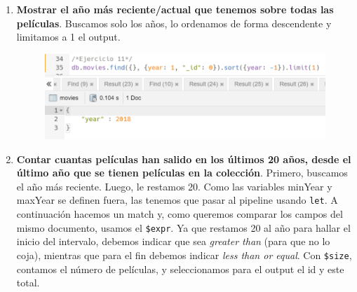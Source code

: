 \documentclass[a4paper,onecolumn]{article}
\begin{document}
\begin{sloppypar}
\begin{enumerate}
\begin{center}
    \end{center}
    \item \textbf{Mostrar el año más reciente/actual que tenemos sobre todas las películas}. Buscamos solo los años, lo ordenamos de forma descendente y limitamos a 1 el output.
    \begin{center}
        \begin{figure}[h!]
            \includegraphics[width=\textwidth]{querys/11.png}
        \end{figure}
    \end{center}
    \newpage
    \item \textbf{Contar cuantas películas han salido en los últimos 20 años, desde el último año que se tienen películas en la colección}. Primero, buscamos el año más reciente. Luego, le restamos 20.
    Como las variables minYear y maxYear se definen fuera, las tenemos que pasar al pipeline usando \texttt{let}. A continuación hacemos un match y, como queremos comparar los campos del mismo documento,
    usamos el \texttt{\$expr}. Ya que restamos 20 al año para hallar el inicio del intervalo, debemos indicar que sea \textit{greater than} (para que no lo coja), mientras que para el fin debemos indicar \textit{less than or equal}.
    Con \texttt{\$size}, contamos el número de películas, y seleccionamos para el output el id y este total.
    \begin{center}
        \begin{figure}[h!]

\end{figure}
\end{center}
\end{enumerate}
\end{sloppypar}
\end{document}
